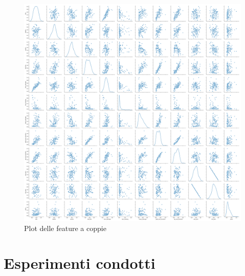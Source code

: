\documentclass[a4paper,12pt,openany,oneside]{book}
\begin{document}
\begin{figure}[H]
	\includegraphics[width=\linewidth]{pics/pairplot.png}
	\caption{Plot delle feature a coppie}
	\label{fig:pairplot}
\end{figure}

\section{Esperimenti condotti}
\end{document}
